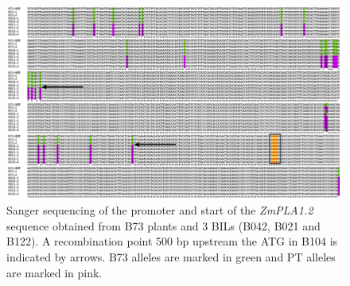 \documentclass[9pt,twocolumn,twoside,lineno]{BioRxiv}
\begin{document}
\clearpage

\begin{figure}[t]
\begin{center}
\includegraphics[width=0.9 \paperwidth]{Sup_Figures/Sup_Fig_4.png}
\caption{Sanger sequencing of the promoter and start of the \textit{ZmPLA1.2} sequence obtained from B73 plants and 3 BILs (B042, B021 and B122). A recombination point 500 bp upstream the ATG in B104 is indicated by arrows. B73 alleles are marked in green and PT alleles are marked in pink. 
}
\label{SupFig4}
\end{center}
\end{figure} 

\clearpage
\end{document}
